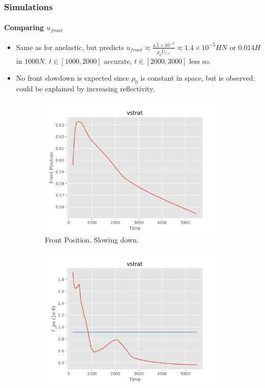 \documentclass[dvipsnames, 10pt]{beamer}
\newcommand*{\scinot}[2]{#1\times10^{#2}}
\begin{document}
\begin{frame}
    \frametitle{Simulations}
    \framesubtitle{Comparing $u_{front}$}

    \begin{itemize}
        \item Same as for anelastic, but predicts
            $u_{front} \approx \frac{\scinot{4.5}{-7}}{\rho_0 \bar{U}_{x, c}}
            \approx \scinot{1.4}{-5}HN$ or $0.014H$ in $1000N$. $t \in [1000,
            2000]$ accurate, $t \in [2000, 3000]$ less so.

        \item No front slowdown is expected since $\rho_0$ is constant in space,
            but is observed; could be explained by increasing reflectivity.
    \end{itemize}
    \begin{figure}[t]
        \centering
        \hspace*{-19mm}%
        \begin{subfigure}{0.53\textwidth}
            \centering
            \includegraphics[width=\textwidth]{front_vstrat.png}
            \caption{Front Position. Slowing down.}
        \end{subfigure}
        \begin{subfigure}{0.53\textwidth}
            \centering
            \includegraphics[width=\textwidth]{fluxes_vstrat.png}

\end{subfigure}
\end{figure}
\end{frame}
\end{document}
